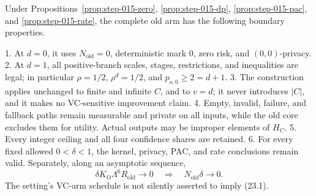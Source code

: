 \begin{proposition}\label{prop:step-015-boundaries}
Under Propositions~\ref{prop:step-015-zero},
\ref{prop:step-015-dp}, \ref{prop:step-015-pac}, and
\ref{prop:step-015-rate}, the complete old arm has the following boundary
properties.

1. At \(d=0\), it uses \(N_{\mathrm{old}}=0\), deterministic mark \(0\),
   zero risk, and \((0,0)\)-privacy.
2. At \(d=1\), all positive-branch scales, stages, restrictions, and
   inequalities are legal; in particular \(\rho=1/2\),
   \(\rho^d=1/2\), and \(p_{\mathrm o,0}\ge2=d+1\).
3. The construction applies unchanged to finite and infinite \(C\), and to
   \(v=d\); it never introduces \(|C|\), and it makes no VC-sensitive
   improvement claim.
4. Empty, invalid, failure, and fallback paths remain measurable and
   private on all inputs, while the old core excludes them for utility.
   Actual outputs may be improper elements of \(H_C\).
5. Every integer ceiling and all four confidence shares are retained.
6. For every fixed allowed \(0<\delta<1\), the kernel, privacy, PAC, and
   rate conclusions remain valid. Separately, along an asymptotic sequence,
   \[
   \delta K_{\mathrm O}\Lambda^6R_{\mathrm{old}}\longrightarrow0
   \quad\Longrightarrow\quad
   N_{\mathrm{old}}\delta\longrightarrow0.
   \tag{23.1}
   \]
   The setting's VC-arm schedule is not silently asserted to imply
   (23.1).


\end{proposition}

